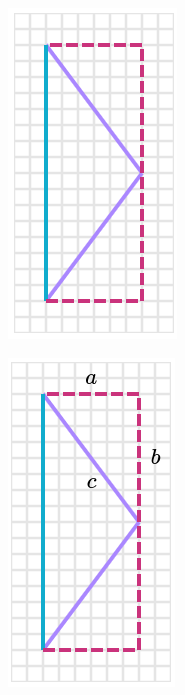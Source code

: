 \begin{solutionbox}{14cm}
    \begin{minipage}{0.4\textwidth}
        \begin{multicols}{2}
            \begin{figure}[H]
                \centering
                \includegraphics[width=0.5\linewidth]{../images/peri_isos_03a.png}
                \caption{}
                \label{fig:peri_isos_03a}
            \end{figure}%
            \begin{figure}[H]
                \centering
                \includegraphics[width=0.5\linewidth]{../images/peri_isos_03b.png}

\end{figure}
\end{multicols}
\end{minipage}
\end{solutionbox}
